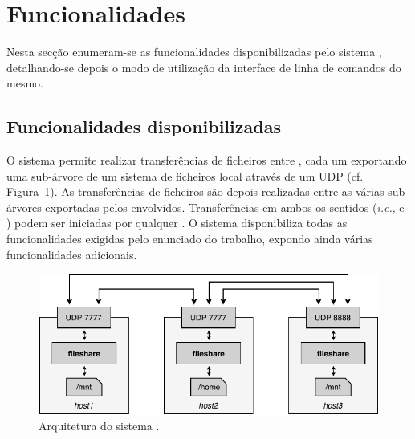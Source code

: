 
\section{Funcionalidades}
\label{sec:func}

Nesta secção enumeram-se as funcionalidades disponibilizadas pelo sistema \SYS, detalhando-se depois o modo de utilização da interface de linha de comandos do mesmo.


\subsection{Funcionalidades disponibilizadas}

O sistema \SYS permite realizar transferências de ficheiros entre , cada um exportando uma sub-árvore de um sistema de ficheiros local através de um  UDP (cf. Figura~\ref{fig:func:arch}). As transferências de ficheiros são depois realizadas entre as várias sub-árvores exportadas pelos  envolvidos. Transferências em ambos os sentidos (\emph{i.e.},  e ) podem ser iniciadas por qualquer . O sistema disponibiliza todas as funcionalidades exigidas pelo enunciado do trabalho, expondo ainda várias funcionalidades adicionais.

\begin{figure}[ht]
  \centering
  \vspace*{.1\baselineskip}
  \includegraphics{figures/arch.pdf}
  \caption{Arquitetura  do sistema \SYS.}
  \label{fig:func:arch}
  \vspace*{-.7\baselineskip}
\end{figure}


